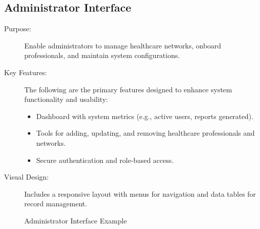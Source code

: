 \documentclass[12pt, titlepage]{article}
\begin{document}
\subsection{Administrator Interface}
\begin{description}
    \item[Purpose:] Enable administrators to manage healthcare networks, onboard professionals, and maintain system configurations.
    
    \item[Key Features:] The following are the primary features designed to enhance system functionality and usability:
    \begin{itemize}
        \item Dashboard with system metrics (e.g., active users, reports generated).
        \item Tools for adding, updating, and removing healthcare professionals and networks.
        \item Secure authentication and role-based access.
    \end{itemize}
    
    \item[Visual Design:] Includes a responsive layout with menus for navigation and data tables for record management.
\end{description}

\begin{figure}[h!]
    \centering
    \caption{Administrator Interface Example}
    \label{fig:admin-interface}
\end{figure}
\end{document}
